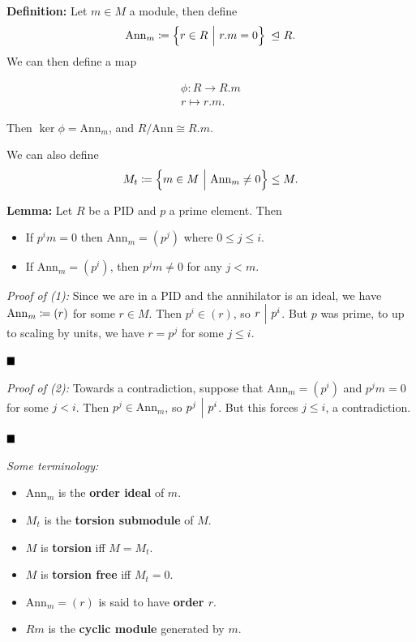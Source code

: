 \textbf{Definition:} Let \(m\in M\) a module, then define \[
\mathrm{Ann}_m \coloneqq \left\{{r\in R {~\mathrel{\Big|}~} r.m = 0 }\right\} {~\trianglelefteq~} R.
\] We can then define a map

\begin{align*}
\phi: R \to R.m \\
r \mapsto r.m
.\end{align*}

Then \(\ker \phi = \mathrm{Ann}_m\), and \(R/\mathrm{Ann} \cong R.m\).

We can also define \[
M_t \coloneqq \left\{{m\in M {~\mathrel{\Big|}~} \mathrm{Ann}_m \neq 0}\right\} \leq M.
\]

\textbf{Lemma:} Let \(R\) be a PID and \(p\) a prime element. Then

\begin{itemize}
\tightlist
\item
  If \(p^i m = 0\) then \(\mathrm{Ann}_m = (p^j)\) where
  \(0\leq j\leq i\).
\item
  If \(\mathrm{Ann}_m = (p^i)\), then \(p^jm \neq 0\) for any \(j < m\).
\end{itemize}

\emph{Proof of (1):} Since we are in a PID and the annihilator is an
ideal, we have \(\mathrm{Ann}_m \coloneqq (r)\) for some \(r\in M\).
Then \(p^i \in (r)\), so \(r {~\Bigm| ~} p^i\). But \(p\) was prime, to up
to scaling by units, we have \(r = p^j\) for some \(j \leq i\).

\(\qed\)

\emph{Proof of (2):} Towards a contradiction, suppose that
\(\mathrm{Ann}_m = (p^i)\) and \(p^jm = 0\) for some \(j < i\). Then
\(p^j \in \mathrm{Ann}_m\), so \(p^j {~\Bigm| ~} p^i\). But this forces
\(j \leq i\), a contradiction.

\(\qed\)

\emph{Some terminology:}

\begin{itemize}
\item
  \(\mathrm{Ann}_m\) is the \textbf{order ideal} of \(m\).
\item
  \(M_t\) is the \textbf{torsion submodule} of \(M\).
\item
  \(M\) is \textbf{torsion} iff \(M = M_t\).
\item
  \(M\) is \textbf{torsion free} iff \(M_t = 0\).
\item
  \(\mathrm{Ann}_m = (r)\) is said to have \textbf{order \(r\)}.
\item
  \(Rm\) is the \textbf{cyclic module} generated by \(m\).
\end{itemize}

